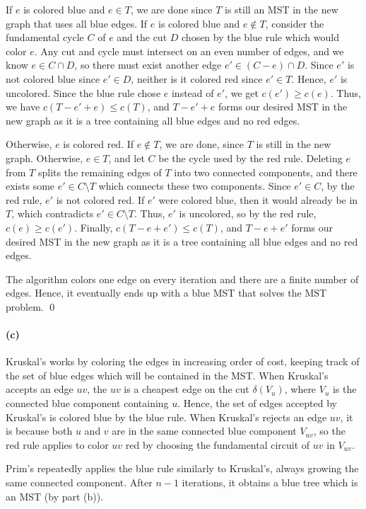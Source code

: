 \documentclass[11pt,letterpaper]{article}
\theoremstyle{definition}
\begin{document}
If $e$ is colored blue and $e\in T$, we are done since $T$ is still an MST in the new graph that uses all blue edges. 
If $e$ is colored blue and $e\notin T$, consider the fundamental cycle $C$ of $e$ and the cut $D$ chosen by the blue rule which would color $e$. 
Any cut and cycle must intersect on an even number of edges, and we know $e\in C\cap D$, so there must exist another edge $e'\in (C - e) \cap D$.
Since $e'$ is not colored blue since $e'\in D$, neither is it colored red since $e'\in T$.
Hence, $e'$ is uncolored.
Since the blue rule chose $e$ instead of $e'$, we get $c(e')\geq c(e)$.
Thus, we have $c(T-e'+e) \leq c(T)$, and $T-e' + e$ forms our desired MST in the new graph as it is a tree containing all blue edges and no red edges.

Otherwise, $e$ is colored red. 
If $e\notin T$, we are done, since $T$ is still in the new graph.
Otherwise, $e\in T$, and let $C$ be the cycle used by the red rule. 
Deleting $e$ from $T$ splits the remaining edges of $T$ into two connected components, and there exists some $e'\in C\setminus T$ which connects these two components.
Since $e'\in C$, by the red rule, $e'$ is not colored red.
If $e'$ were colored blue, then it would already be in $T$, which contradicts $e'\in C\setminus T$.
Thus, $e'$ is uncolored, so by the red rule, $c(e)\geq c(e')$.
Finally, $c(T-e+e')\leq c(T)$, and $T-e+e'$ forms our desired MST in the new graph as it is a tree containing all blue edges and no red edges.

The algorithm colors one edge on every iteration and there are a finite number of edges. Hence, it eventually ends up with a blue MST that solves the MST problem.
\qed

\paragraph{(c)}
Kruskal's works by coloring the edges in increasing order of cost, keeping track of the set of blue edges which will be contained in the MST.
When Kruskal's accepts an edge $uv$, the $uv$ is a cheapest edge on the cut $\delta(V_u)$, where $V_u$ is the connected blue component containing $u$. 
Hence, the set of edges accepted by Kruskal's is colored blue by the blue rule.
When Kruskal's rejects an edge $uv$, it is because both $u$ and $v$ are in the same connected blue component $V_{uv}$, so the red rule applies to color $uv$ red by choosing the fundamental circuit of $uv$ in $V_{uv}$.

Prim's repeatedly applies the blue rule similarly to Kruskal's, always growing the same connected component.
After $n-1$ iterations, it obtains a blue tree which is an MST (by part (b)).
\end{document}
